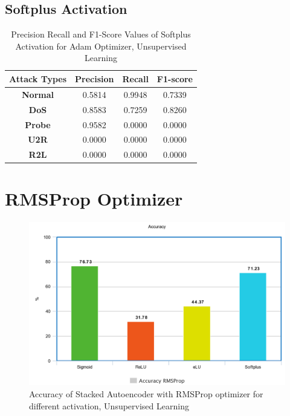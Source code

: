 \documentclass[12pt, a4paper]{report}
\begin{document}
\begin{appendices}
   \subsection{Softplus Activation}
  \begin{table}[h]
		\centering
		\captionsetup{justification=centering,margin=2cm}
		\begin{tabular}{|c|c|c|c|}
		\hline
		\textbf{Attack Types} & \textbf{Precision} & \textbf{Recall} & \textbf{F1-score} \\ \hline
		\textbf{Normal}       & 0.5814             & 0.9948          & 0.7339            \\ \hline
		\textbf{DoS}          & 0.8583             & 0.7259          & 0.8260            \\ \hline
		\textbf{Probe}        & 0.9582             & 0.0000          & 0.0000            \\ \hline
		\textbf{U2R}          & 0.0000             & 0.0000          & 0.0000            \\ \hline
		\textbf{R2L}          & 0.0000             & 0.0000          & 0.0000            \\ \hline
		\end{tabular}
		\caption{Precision Recall and F1-Score Values of Softplus Activation for Adam Optimizer, Unsupervised Learning}
		\label{classification softplus adam tf}
		\end{table} 
\clearpage
\section {RMSProp Optimizer}

  	\begin{figure}[ht]
	\centering
	\captionsetup{justification=centering,margin=2cm}
	\includegraphics[width=13cm]{RMSprop_accuracy_tensorflow.png}
	\caption{ Accuracy of Stacked Autoencoder with RMSProp optimizer for different activation, Unsupervised Learning }
	\label{fig:acc_RMSProp_tf}
	\end{figure}
	

\end{appendices}
\end{document}
